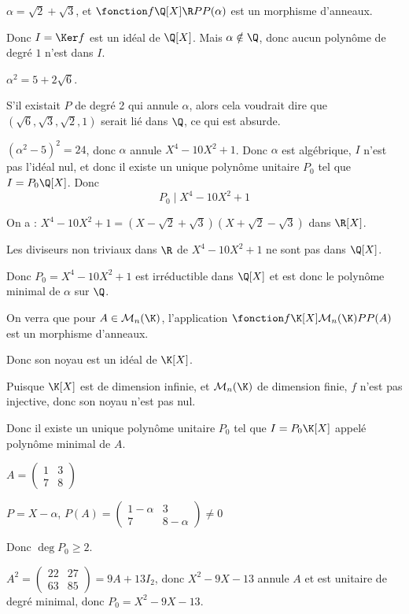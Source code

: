 \begin{exemple}
    $\alpha = \sqrt 2 + \sqrt 3$, et $\fonction f {\Q[X]} \R P {P(\alpha)}$ est un morphisme d'anneaux.

    Donc $I = \Ker f$ est un idéal de $\Q[X]$. Mais $\alpha \notin \Q$, donc aucun 
    polynôme de degré $1$ n'est dans $I$.

    $\alpha^2 = 5 + 2 \sqrt 6$. 

    S'il existait $P$ de degré 2 qui annule $\alpha$, alors cela voudrait dire que 
    $(\sqrt 6, \sqrt 3, \sqrt 2, 1)$ serait lié dans $\Q$, ce qui est absurde. 

    $(\alpha^2 - 5)^2 = 24$, donc $\alpha$ annule $X^4 - 10 X^2 + 1$. Donc $\alpha$ est algébrique, 
    $I$ n'est pas l'idéal nul, et donc il existe un unique polynôme unitaire $P_0$ tel que
    $I = P_0 \Q[X]$.
    Donc \[P_0 \mid X^4 - 10 X^2 + 1\]

    On a : $X^4 - 10 X^2 + 1 = (X - \sqrt 2 + \sqrt 3)(X + \sqrt 2 - \sqrt 3)$ dans $\R[X]$.

    Les diviseurs non triviaux dans $\R$ de $X^4 - 10 X^2 + 1$ ne sont pas dans $\Q[X]$.

    Donc $P_0 = X^4 - 10 X^2 + 1$ est irréductible dans $\Q[X]$ et est donc le polynôme minimal de
    $\alpha$ sur $\Q$.
\end{exemple}

\begin{exemple}
    On verra que pour $A \in \mathcal M_n(\K)$, l'application $\fonction f {\K[X]}{\mathcal M_n(\K)}{P}{P(A)}$ est un morphisme d'anneaux.

    Donc son noyau est un idéal de $\K[X]$.

    Puisque $\K[X]$ est de dimension infinie, et $\mathcal M_n(\K)$ de dimension finie,
    $f$ n'est pas injective, donc son noyau n'est pas nul.

    Donc il existe un unique polynôme unitaire $P_0$ tel que $I = P_0 \K[X]$ appelé polynôme
    minimal de $A$.

    \avspace $A = \begin{pmatrix}
        1 & 3 \\
        7 & 8
    \end{pmatrix}$

    $P = X - \alpha$, $P(A) = \begin{pmatrix}
        1 - \alpha & 3 \\
        7 & 8 - \alpha
    \end{pmatrix} \neq 0 $

    Donc $\deg P_0 \geqslant 2$.

    $A^2 = \begin{pmatrix}
        22 & 27 \\
        63 & 85
    \end{pmatrix} = 9A + 13 I_2$, donc $X^2 - 9X - 13$ annule $A$ et est unitaire de degré minimal, 
    donc $P_0 = X^2 - 9X - 13$.
\end{exemple}

